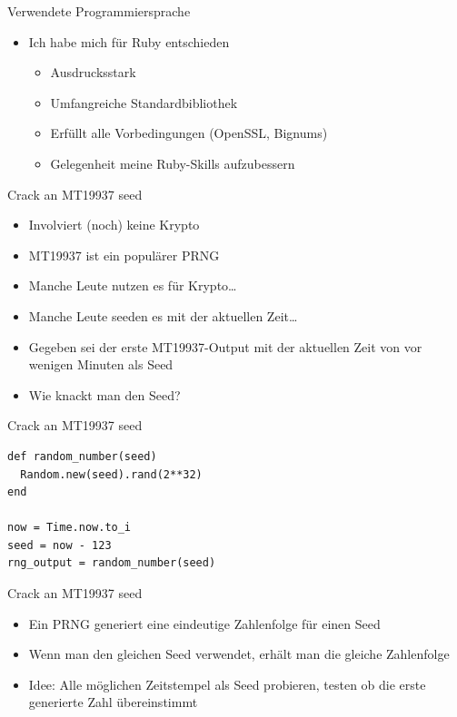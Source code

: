 \documentclass[presentation]{beamer}
\begin{document}
\begin{frame}[label={sec:org96441e4}]{Verwendete Programmiersprache}
\begin{itemize}
\item Ich habe mich für Ruby entschieden
\begin{itemize}
\item Ausdrucksstark
\item Umfangreiche Standardbibliothek
\item Erfüllt alle Vorbedingungen (OpenSSL, Bignums)
\item Gelegenheit meine Ruby-Skills aufzubessern
\end{itemize}
\end{itemize}
\end{frame}

\begin{frame}[label={sec:orga4d111c}]{Crack an MT19937 seed}
\begin{itemize}
\item Involviert (noch) keine Krypto
\item MT19937 ist ein populärer PRNG
\item Manche Leute nutzen es für Krypto\ldots{}
\item Manche Leute seeden es mit der aktuellen Zeit\ldots{}
\item Gegeben sei der erste MT19937-Output mit der aktuellen Zeit von vor
wenigen Minuten als Seed
\item Wie knackt man den Seed?
\end{itemize}
\end{frame}

\begin{frame}[fragile,label={sec:org6d0ca3b}]{Crack an MT19937 seed}
 \begin{verbatim}
def random_number(seed)
  Random.new(seed).rand(2**32)
end

now = Time.now.to_i
seed = now - 123
rng_output = random_number(seed)
\end{verbatim}
\end{frame}

\begin{frame}[label={sec:orgf343eff}]{Crack an MT19937 seed}
\begin{itemize}
\item Ein PRNG generiert eine eindeutige Zahlenfolge für einen Seed
\item Wenn man den gleichen Seed verwendet, erhält man die gleiche
Zahlenfolge
\item Idee: Alle möglichen Zeitstempel als Seed probieren, testen ob die
erste generierte Zahl übereinstimmt
\end{itemize}
\end{frame}
\end{document}

